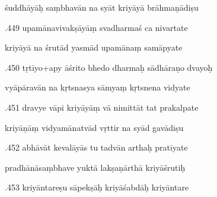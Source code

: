\documentclass[article,12pt,a4paper]{memoir}%
\newcounter{parCount}
\begin{document}
	  
	  \pstart \leavevmode%
	śuddhāyāḥ saṃbhavān na syāt kriyāyā brāhmaṇādiṣu 
	{}
	\pend%
      

	  
	  \pstart {}.449 upamānavivakṣāyāṃ svadharmaś ca nivartate 
	{}
	\pend%
      

	  
	  \pstart \leavevmode%
	kriyāyā na śrutād yasmād upamānaṃ samāpyate 
	{}
	\pend%
      

	  
	  \pstart {}.450 tṛtīyo+apy āśrito bhedo dharmaḥ sādhāraṇo dvayoḥ 
	{}
	\pend%
      

	  
	  \pstart \leavevmode%
	vyāpāravān na kṛtsnasya sāmyaṃ kṛtsnena vidyate 
	{}
	\pend%
      

	  
	  \pstart {}.451 dravye vāpi kriyāyāṃ vā nimittāt tat prakalpate 
	{}
	\pend%
      

	  
	  \pstart \leavevmode%
	kriyāṇāṃ vidyamānatvād vṛttir na syād gavādiṣu 
	{}
	\pend%
      

	  
	  \pstart {}.452 abhāvāt kevalāyās tu tadvān arthaḥ pratīyate 
	{}
	\pend%
      

	  
	  \pstart \leavevmode%
	pradhānāsaṃbhave yuktā lakṣaṇārthā kriyāśrutiḥ 
	{}
	\pend%
      

	  
	  \pstart {}.453 kriyāntareṣu sāpekṣāḥ kriyāśabdāḥ kriyāntare 
	{}
	\pend%
      
\end{document}
